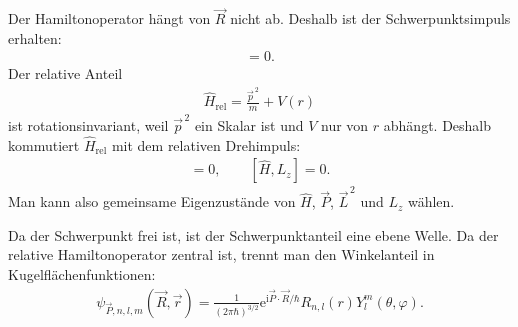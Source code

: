 \documentclass[11pt,a4paper]{scrartcl}
\newcommand{\op}[1]{\hat{#1}}
\newcommand{\e}{\mathrm e}
\newcommand{\ii}{\mathrm i}
\begin{document}
\begin{enumerate}[label=(\alph*)]
\begin{calculationbox}
            \begin{calculationbox}[title=Kommutatoren]
                Der Hamiltonoperator hängt von $\vec R$ nicht ab. Deshalb ist der Schwerpunktsimpuls erhalten:
                \begin{align*}
                    [\op H,\vec P]=0.
                \end{align*}
                Der relative Anteil
                \begin{align*}
                    \op H_{\mathrm{rel}}=\frac{\vec p^{\,2}}{m}+V(r)
                \end{align*}
                ist rotationsinvariant, weil $\vec p^{\,2}$ ein Skalar ist und $V$ nur von $r$ abhängt. Deshalb kommutiert $\op H_{\mathrm{rel}}$ mit dem relativen Drehimpuls:
                \begin{align*}
                    [\op H,\vec L^{\,2}]=0,
                    \qquad
                    [\op H,L_z]=0.
                \end{align*}
                Man kann also gemeinsame Eigenzustände von $\op H$, $\vec P$, $\vec L^{\,2}$ und $L_z$ wählen.
            \end{calculationbox}

            \begin{calculationbox}[title=Separationsansatz]
                Da der Schwerpunkt frei ist, ist der Schwerpunktanteil eine ebene Welle. Da der relative Hamiltonoperator zentral ist, trennt man den Winkelanteil in Kugelflächenfunktionen:
                \begin{align*}
                    \psi_{\vec P,n,l,m}(\vec R,\vec r)
                    =
                    \frac{1}{(2\pi\hbar)^{3/2}}
                    \e^{\ii\vec P\cdot\vec R/\hbar}
                    R_{n,l}(r)Y_l^m(\theta,\varphi).
                \end{align*}
            \end{calculationbox}


\end{calculationbox}
\end{enumerate}
\end{document}
